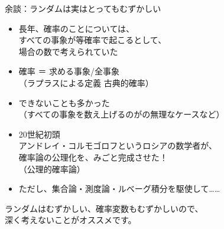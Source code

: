 \documentclass[dvipdfmx,cjk,handout]{beamer}
\begin{document}
\begin{frame}{余談：ランダムは実はとってもむずかしい} \pause


\begin{itemize}
    \item 長年、確率のことについては、\\
    すべての事象が等確率で起こるとして、\\
    場合の数で考えられていた \pause
    \item 確率 ＝ 求める事象/全事象 \\
    （ラプラスによる定義 古典的確率） \pause
    \item できないことも多かった \\
    （すべての事象を数え上げるのがの無理なケースなど） \pause

    \item 20世紀初頭 \\ \pause
    アンドレイ・コルモゴロフというロシアの数学者が、 \\
    確率論の公理化を、みごと完成させた！\\
    （公理的確率論） \pause

    \item ただし、集合論・測度論・ルベーグ積分を駆使して……  \pause
\end{itemize}


\vskip 0.3cm

ランダムはむずかしい、確率変数もむずかしいので、\\
深く考えないことがオススメです。


\end{frame}
\end{document}
